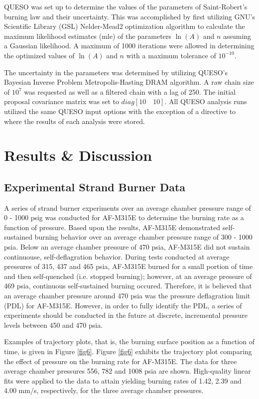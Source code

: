 \documentclass{article}
\begin{document}
QUESO was set up to determine the values of the parameters of Saint-Robert's burning law and their uncertainty.
This was accomplished by first utilizing GNU's Scientific Library (GSL) Nelder-Mead2 optimization algorithm to 
calculate the maximum likelihood estimates (mle) of the parameters $\ln(A)$ and $n$ assuming a Gaussian likelihood. 
A maximum of 1000 iterations were allowed in determining the optimized values of $\ln(A)$ and $n$ with a maximum 
tolerance of $10^{-10}$. 

The uncertainty in the parameters was determined by utilizing QUESO's Bayesian Inverse Problem Metropolis-Hasting 
DRAM algorithm. A raw chain size of $10^7$ was requested as well as a filtered chain with a lag of 250. The initial 
proposal covariance matrix was set to $diag[10 \quad 10]$. All QUESO analysis runs utilized the same QUESO input 
options with the exception of a directive to where the results of each analysis were stored.

\section{Results \& Discussion} \label{results}

\subsection{Experimental Strand Burner Data} \label{resultsExpr}

A series of strand burner experiments over an average chamber pressure range of 0 - 1000 psig was conducted for 
AF-M315E to determine the burning rate as a function of pressure. Based upon the results, AF-M315E demonstrated
self-sustained burning behavior over an average chamber pressure range of 300 - 1000 psia. Below an average 
chamber pressure of 470 psia, AF-M315E did not sustain continuouse, self-deflagration behavior. During tests
conducted at average pressures of 315, 437 and 465 psia, AF-M315E burned for a small portion of time and then
self-quenched (i.e. stopped burning); however, at an average pressure of 469 psia, continuous self-sustained
burning occured. Therefore, it is believed that an average chamber pressure around 470 psia was the pressure
deflagration limit (PDL) for AF-M315E. However, in order to fully identify the PDL, a series of experiments 
should be conducted in the future at discrete, incremental pressure levels between 450 and 470 psia.

Examples of trajectory plots, that is, the burning surface position as a function of time, is given in Figure
\ref{fig6}. Figure \ref{fig6} exhibits the trajectory plot comparing the effect of pressure on the burning rate
for AF-M315E. The data for three average chamber pressures 556, 782 and 1008 psia are shown. High-quality linear
fits were applied to the data to attain yielding burning rates of 1.42, 2.39 and 4.00 mm/s, respectively, for
the three average chamber pressures.
\end{document}
